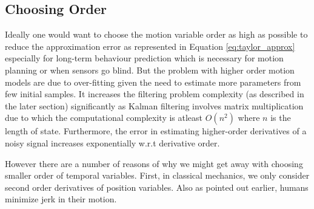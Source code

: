 \documentclass[conference]{IEEEtran}
\begin{document}
\subsection{Choosing Order}
Ideally one would want to choose the motion variable order as high as possible to reduce the approximation error as represented in Equation \ref{eq:taylor_approx} especially for long-term behaviour prediction which is necessary for motion planning or when sensors go blind. But the problem with higher order motion models are due to over-fitting given the need to estimate more parameters from few initial samples. It increases the filtering problem complexity (as described in the later section) significantly as Kalman filtering involves matrix multiplication due to which the computational complexity is atleast $O(n^2)$ where $n$ is the length of state. Furthermore, the error in estimating higher-order derivatives of a noisy signal increases exponentially w.r.t derivative order.

However there are a number of reasons of why we might get away with choosing smaller order of temporal variables. First, in classical mechanics, we only consider second order derivatives of position variables. Also as pointed out earlier, humans minimize jerk \cite{flash1985coordination} in their motion.

\end{document}
